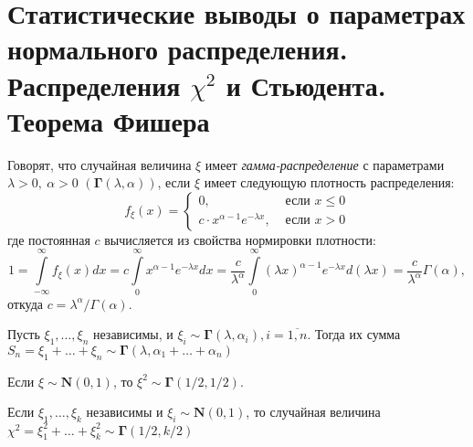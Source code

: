 \section{Статистические выводы о параметрах нормального распределения. Распределения \texorpdfstring{$\chi^{2}$}{хи-квадрат} и Стьюдента. Теорема Фишера}

\begin{defn}
    Говорят, что случайная величина $\xi$ имеет \textit{гамма-распределение} с параметрами $\lambda > 0,~ \alpha > 0$ $(\mathbf{\Gamma}(\lambda, \alpha))$, 
    если $\xi$ имеет следующую плотность распределения:
    \begin{equation*}
        f_{\xi}(x) = \begin{cases}
            0, & \text { если } x \leqslant 0 \\
            c \cdot x^{\alpha-1} e^{-\lambda x}, & \text { если } x>0
        \end{cases}
    \end{equation*}
    где постоянная $c$ вычисляется из свойства нормировки плотности:
    \begin{equation*}
        1 = 
        \int\limits_{-\infty}^{\infty} f_{\xi}(x) d x = 
        c \int\limits_{0}^{\infty} x^{\alpha-1} e^{-\lambda x} d x = 
        \frac{c}{\lambda^{\alpha}} \int\limits_{0}^{\infty}(\lambda x)^{\alpha-1} e^{-\lambda x} d(\lambda x) = 
        \frac{c}{\lambda^{\alpha}} \Gamma(\alpha),
    \end{equation*}
    откуда $c=\lambda^{\alpha} / \Gamma(\alpha)$.
\end{defn}

\begin{lem}
    Пусть $\xi_{1}, \ldots, \xi_{n}$ независимы, и $\xi_i \sim \mathbf{\Gamma}(\lambda, \alpha_i), i=\overline{1,n}$. 
    Тогда их сумма $S_{n}=\xi_{1}+\ldots+\xi_{n} \sim \mathbf{\Gamma}(\lambda, \alpha_1 + \ldots + \alpha_n)$
\end{lem}
\begin{lem}
    Если $\xi \sim \mathbf{N}(0,1)$, то $\xi^2 \sim \mathbf{\Gamma}(1/2, 1/2)$.
\end{lem}
\begin{crlr}
    Если $\xi_{1}, \ldots, \xi_{k}$ независимы и $\xi_i \sim \mathbf{N}(0,1)$, то случайная величина $\chi^{2}=\xi_{1}^{2}+\ldots+\xi_{k}^{2} \sim \mathbf{\Gamma}(1/2, k/2)$
\end{crlr}


